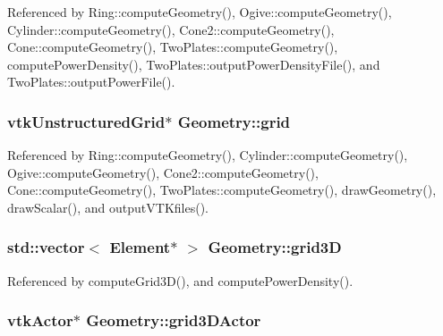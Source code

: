 Referenced by Ring\-::compute\-Geometry(), Ogive\-::compute\-Geometry(), Cylinder\-::compute\-Geometry(), Cone2\-::compute\-Geometry(), Cone\-::compute\-Geometry(), Two\-Plates\-::compute\-Geometry(), compute\-Power\-Density(), Two\-Plates\-::output\-Power\-Density\-File(), and Two\-Plates\-::output\-Power\-File().

\hypertarget{classGeometry_aebabda9f0c07ecb986195857913b4ee8}{
\subsubsection[{grid}]{\setlength{\rightskip}{0pt plus 5cm}vtk\-Unstructured\-Grid$\ast$ Geometry\-::grid\hspace{0.3cm}{\ttfamily [protected]}}}\label{classGeometry_aebabda9f0c07ecb986195857913b4ee8}


Referenced by Ring\-::compute\-Geometry(), Cylinder\-::compute\-Geometry(), Ogive\-::compute\-Geometry(), Cone2\-::compute\-Geometry(), Cone\-::compute\-Geometry(), Two\-Plates\-::compute\-Geometry(), draw\-Geometry(), draw\-Scalar(), and output\-V\-T\-Kfiles().

\hypertarget{classGeometry_a08864bd3e1225949b6617f94ab1af9ab}{
\subsubsection[{grid3\-D}]{\setlength{\rightskip}{0pt plus 5cm}std\-::vector$<$ {\bf Element}$\ast$ $>$ Geometry\-::grid3\-D\hspace{0.3cm}{\ttfamily [protected]}}}\label{classGeometry_a08864bd3e1225949b6617f94ab1af9ab}


Referenced by compute\-Grid3\-D(), and compute\-Power\-Density().

\hypertarget{classGeometry_a2bf0d89ae708392842128430e08b0e32}{
\subsubsection[{grid3\-D\-Actor}]{\setlength{\rightskip}{0pt plus 5cm}vtk\-Actor$\ast$ Geometry\-::grid3\-D\-Actor\hspace{0.3cm}{\ttfamily [protected]}}}\label{classGeometry_a2bf0d89ae708392842128430e08b0e32}


